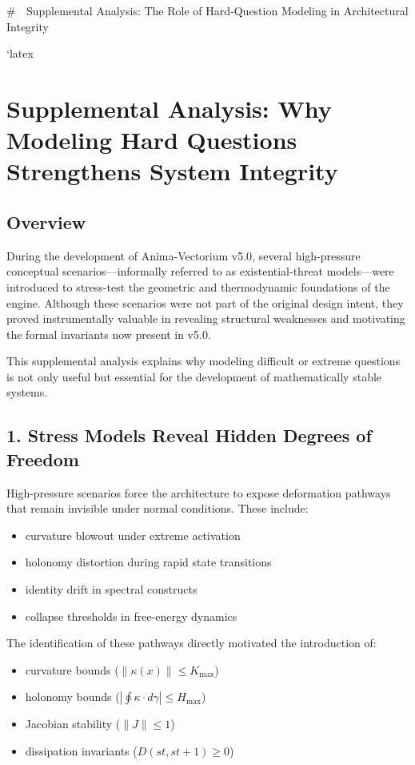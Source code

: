 # 📘 Supplemental Analysis: The Role of Hard‑Question Modeling in Architectural Integrity

`latex
\section*{Supplemental Analysis: Why Modeling Hard Questions Strengthens System Integrity}

\subsection*{Overview}

During the development of Anima-Vectorium v5.0, several high-pressure conceptual
scenarios—informally referred to as existential-threat models—were introduced to
stress-test the geometric and thermodynamic foundations of the engine. Although
these scenarios were not part of the original design intent, they proved
instrumentally valuable in revealing structural weaknesses and motivating the
formal invariants now present in v5.0.

This supplemental analysis explains why modeling difficult or extreme questions
is not only useful but essential for the development of mathematically stable
systems.

\subsection*{1. Stress Models Reveal Hidden Degrees of Freedom}

High-pressure scenarios force the architecture to expose deformation pathways
that remain invisible under normal conditions. These include:

\begin{itemize}
    \item curvature blowout under extreme activation
    \item holonomy distortion during rapid state transitions
    \item identity drift in spectral constructs
    \item collapse thresholds in free-energy dynamics
\end{itemize}

The identification of these pathways directly motivated the introduction of:

\begin{itemize}
    \item curvature bounds ($\|\kappa(x)\| \le K_{\max}$)
    \item holonomy bounds ($|\oint \kappa \cdot d\gamma| \le H_{\max}$)
    \item Jacobian stability ($\|J\| \le 1$)
    \item dissipation invariants ($D(st, s{t+1}) \ge 0$)
\end{itemize}

